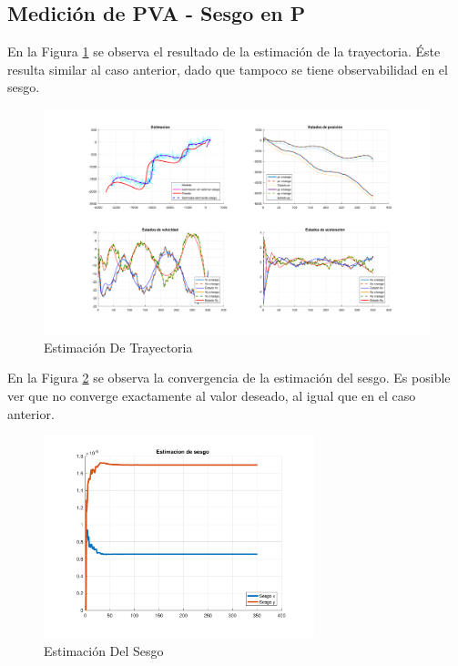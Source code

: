 
\subsection{Medición de PVA - Sesgo en P}

	En la Figura \ref{fig:ej4b} se observa el resultado de la estimación de la trayectoria. Éste resulta similar al caso anterior, dado que tampoco se tiene observabilidad en el sesgo.

	\begin{figure}[H]
		\centering
		\includegraphics[scale=0.5,trim={6,5cm 0 0 0}]{Figuras/graf_ej4b.pdf}
		\caption{Estimación De Trayectoria}
		\label{fig:ej4b}
	\end{figure}
	
	En la Figura \ref{fig:ej4b_bias} se observa la convergencia de la estimación del sesgo. Es posible ver que no converge exactamente al valor deseado, al igual que en el caso anterior.
	
	\begin{figure}[H]
		\centering
		\includegraphics[width=0.7\textwidth,keepaspectratio]{Figuras/bias_ej4b.pdf}
		\caption{Estimación Del Sesgo}
		\label{fig:ej4b_bias}
	\end{figure}
	
